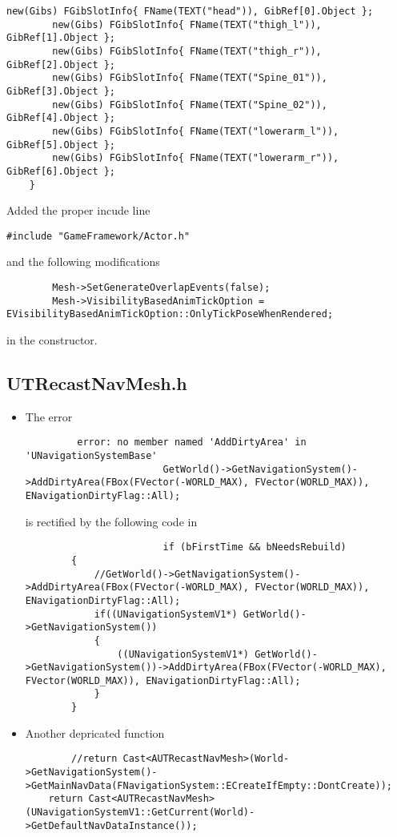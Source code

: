 \documentclass{article}
\begin{document}
\begin{itemize}
\begin{lstlisting}[frame=single]
		new(Gibs) FGibSlotInfo{ FName(TEXT("head")), GibRef[0].Object };
		new(Gibs) FGibSlotInfo{ FName(TEXT("thigh_l")), GibRef[1].Object };
		new(Gibs) FGibSlotInfo{ FName(TEXT("thigh_r")), GibRef[2].Object };
		new(Gibs) FGibSlotInfo{ FName(TEXT("Spine_01")), GibRef[3].Object };
		new(Gibs) FGibSlotInfo{ FName(TEXT("Spine_02")), GibRef[4].Object };
		new(Gibs) FGibSlotInfo{ FName(TEXT("lowerarm_l")), GibRef[5].Object };
		new(Gibs) FGibSlotInfo{ FName(TEXT("lowerarm_r")), GibRef[6].Object };
	}
      \end{lstlisting}
      Added the proper incude line
\lstset{language=c++}
      \begin{lstlisting}[frame=single]
        #include "GameFramework/Actor.h"
      \end{lstlisting}
      and the following modifications
\lstset{language=c++}
      \begin{lstlisting}
        Mesh->SetGenerateOverlapEvents(false);
        Mesh->VisibilityBasedAnimTickOption = EVisibilityBasedAnimTickOption::OnlyTickPoseWhenRendered;
      \end{lstlisting}
      in the constructor.
    \end{itemize}

    \subsection{UTRecastNavMesh.h}

    \begin{itemize}
    \item The error
\lstset{language=c++}
      \begin{lstlisting}
         error: no member named 'AddDirtyArea' in 'UNavigationSystemBase'
                        GetWorld()->GetNavigationSystem()->AddDirtyArea(FBox(FVector(-WORLD_MAX), FVector(WORLD_MAX)), ENavigationDirtyFlag::All);
                      \end{lstlisting}
                      is rectified by the following code in
\lstset{language=c++}
                      \begin{lstlisting}
                        if (bFirstTime && bNeedsRebuild)
		{
            //GetWorld()->GetNavigationSystem()->AddDirtyArea(FBox(FVector(-WORLD_MAX), FVector(WORLD_MAX)), ENavigationDirtyFlag::All);
            if((UNavigationSystemV1*) GetWorld()->GetNavigationSystem())
            {
                ((UNavigationSystemV1*) GetWorld()->GetNavigationSystem())->AddDirtyArea(FBox(FVector(-WORLD_MAX), FVector(WORLD_MAX)), ENavigationDirtyFlag::All);
            }
        }
      \end{lstlisting}
    \item Another depricated function
\lstset{language=c++}
      \begin{lstlisting}
        //return Cast<AUTRecastNavMesh>(World->GetNavigationSystem()->GetMainNavData(FNavigationSystem::ECreateIfEmpty::DontCreate));
    return Cast<AUTRecastNavMesh>(UNavigationSystemV1::GetCurrent(World)->GetDefaultNavDataInstance());
      \end{lstlisting}
    \end{itemize}
\end{document}
